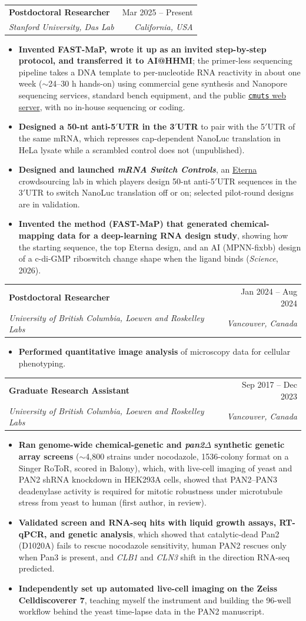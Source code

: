 \documentclass[letterpaper,11pt]{article}
\makeatletter
\newcommand{\resumeItem}[1]{
  \item\small{
    {#1 \vspace{1pt}}
  }
}
\newcommand{\resumeSubheading}[4]{
  \vspace{4pt}\item
    \begin{tabular*}{0.97\textwidth}[t]{l@{\extracolsep{\fill}}r}
      \textbf{#1} & #2 \\
      \textit{\small#3} & \textit{\small #4} \\
    \end{tabular*}\vspace{-4pt}
}
\newcommand{\resumeItemListStart}{\begin{itemize}}
\newcommand{\resumeItemListEnd}{\end{itemize}\vspace{-2pt}}
\makeatother
\begin{document}
   \resumeSubheading
    {Postdoctoral Researcher}{Mar 2025 -- Present}
    {Stanford University, Das Lab}{California, USA}
    \resumeItemListStart
        \resumeItem{\textbf{Invented FAST-MaP, wrote it up as an invited step-by-step protocol, and transferred it to AI@HHMI}; the primer-less sequencing pipeline takes a DNA template to per-nucleotide RNA reactivity in about one week ($\sim$24--30 h hands-on) using commercial gene synthesis and Nanopore sequencing services, standard bench equipment, and the public \href{https://huggingface.co/spaces/daslab-stanford/cmuts}{\texttt{cmuts} web server}, with no in-house sequencing or coding.}
        \resumeItem{\textbf{Designed a 50-nt anti-5$'$UTR in the 3$'$UTR} to pair with the 5$'$UTR of the same mRNA, which represses cap-dependent NanoLuc translation in HeLa lysate while a scrambled control does not (unpublished).}
        \resumeItem{\textbf{Designed and launched \textit{mRNA Switch Controls}}, an \href{https://eternagame.org/labs/16496126}{Eterna} crowdsourcing lab in which players design 50-nt anti-5$'$UTR sequences in the 3$'$UTR to switch NanoLuc translation off or on; selected pilot-round designs are in validation.}
        \resumeItem{\textbf{Invented the method (FAST-MaP) that generated chemical-mapping data for a deep-learning RNA design study}, showing how the starting sequence, the top Eterna design, and an AI (MPNN-fixbb) design of a c-di-GMP riboswitch change shape when the ligand binds (\textit{Science}, 2026).}
    \resumeItemListEnd

    \resumeSubheading
      {Postdoctoral Researcher}{Jan 2024 -- Aug 2024}
      {University of British Columbia, Loewen and Roskelley Labs}{Vancouver, Canada}
      \resumeItemListStart
        \resumeItem{\textbf{Performed quantitative image analysis} of microscopy data for cellular phenotyping.}
      \resumeItemListEnd

    \resumeSubheading
      {Graduate Research Assistant}{Sep 2017 -- Dec 2023}
      {University of British Columbia, Loewen and Roskelley Labs}{Vancouver, Canada}
      \resumeItemListStart
        \resumeItem{\textbf{Ran genome-wide chemical-genetic and \textit{pan2}$\Delta$ synthetic genetic array screens} ($\sim$4,800 strains under nocodazole, 1536-colony format on a Singer RoToR, scored in Balony), which, with live-cell imaging of yeast and PAN2 shRNA knockdown in HEK293A cells, showed that PAN2--PAN3 deadenylase activity is required for mitotic robustness under microtubule stress from yeast to human (first author, in review).}
        \resumeItem{\textbf{Validated screen and RNA-seq hits with liquid growth assays, RT-qPCR, and genetic analysis}, which showed that catalytic-dead Pan2 (D1020A) fails to rescue nocodazole sensitivity, human PAN2 rescues only when Pan3 is present, and \textit{CLB1} and \textit{CLN3} shift in the direction RNA-seq predicted.}
        \resumeItem{\textbf{Independently set up automated live-cell imaging on the Zeiss Celldiscoverer 7}, teaching myself the instrument and building the 96-well workflow behind the yeast time-lapse data in the PAN2 manuscript.}
      \resumeItemListEnd
\end{document}
